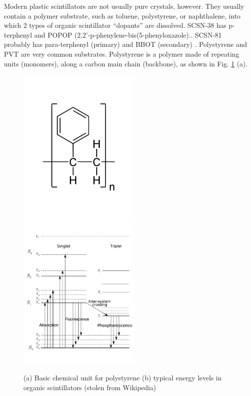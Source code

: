 Modern plastic scintillators are not usually pure crystals, however.
They usually contain a polymer substrate, such as toluene, polystyrene,
or naphthalene, into which 2 types of organic scintillator
``dopants'' are dissolved. SCSN-38 has
 p-terphenyl and POPOP (2,2'-p-phenylene-bis(5-phenyloxazole).\cite{what}.
SCSN-81 probably has para-terphenyl (primary) and BBOT (secondary)
\cite{anna}.
Polystyrene and PVT are very common substrates.  Polystyrene is 
a polymer made of 
repeating
units (monomers), along a carbon main chain (backbone), as shown in Fig. \ref{fig:polystyrene} (a).




\begin{figure}[!htbp]
\centering
      {\includegraphics[width=6cm]{Polystyrene.pdf}}
      {\includegraphics[width=6cm]{Pistates.pdf}}
\caption{
(a)
Basic chemical unit for polystyrene
(b)
typical energy levels in organic scintillators (stolen from Wikipedia)
}
\label{fig:polystyrene}
\end{figure}



